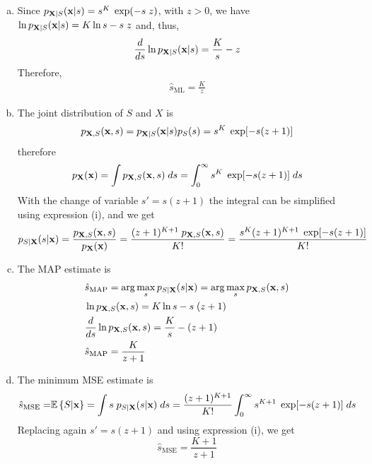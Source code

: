 \begin{solution}[\textcolor{blue}{Solution to problem 2.8}]

\begin{enumerate}[a)]
\item Since $p_{{\bf X}|S}({\bf x}|s) = s^K \; \exp(-s\; z)$, with $z>0$, we have $\ln{p_{{\bf X}|S}({\bf x}|s)} = K \ln{s} - s\; z$ and, thus,
\begin{align*}
\frac{d}{ds} \ln{p_{{\bf X}|S}({\bf x}|s)} = \frac{K}{s} - z
\end{align*}
Therefore,
\begin{align*}
\hat{s}_\text{ML} = \frac{K}{z}
\end{align*}

\item The joint distribution of $S$ and $X$ is
\begin{align*}
p_{{\bf X},S}({\bf x},s) = p_{{\bf X}|S}({\bf x}|s) p_S(s) = s^K \; \exp[-s(z+1)]
\end{align*}
therefore
\begin{align*}
p_{\bf X}({\bf x}) = \int p_{{\bf X},S}({\bf x},s)\; ds = \int_0^\infty s^K \; \exp[-s(z+1)]\;ds 
\end{align*}
With the change of variable $s' = s(z+1)$ the integral can be simplified using expression (i), and we get
\begin{align*}
p_{S|{\bf X}}(s|{\bf x}) 
	= \frac{p_{{\bf X},S}({\bf x},s)}{p_{\bf X}({\bf x})} 
	= \frac{(z+1)^{K+1}\;p_{{\bf X},S}({\bf x},s)}{K !} 
	= \frac{s^K(z+1)^{K+1}\; \exp[-s(z+1)]}{K !}
\end{align*}

\item The MAP estimate is
    \begin{align}
        & {\hat s}_\text{MAP} = \arg\max_s p_{S|{\bf X}}(s|{\bf x}) = \arg\max_s p_{{\bf X},S}({\bf x},s) \nonumber \\
        & \ln{p_{{\bf X},S}({\bf x},s)} = K \ln{s} - s\;(z+1) \nonumber \\
        & \frac{d}{ds} \ln{p_{{\bf X},S}({\bf x},s)} = \frac{K}{s} - (z+1) \nonumber\\
    & {\hat s}_\text{MAP} = \frac{K}{z+1} \nonumber
    \end{align}
    
\item The minimum MSE estimate is
    \begin{align}
        \hat{s}_\text{MSE} = & \mathbb{E}\left\{ S | {\bf x}\right\} = \int s\; p_{S|{\bf X}}(s|{\bf x})\; ds = \displaystyle\frac{(z+1)^{K+1}}{K!} \int_{0}^{\infty} s^{K+1} \; \exp[-s(z+1)]\; ds \nonumber
    \end{align}
    Replacing again $s' = s(z+1)$ and using expression (i), we get $$\hat{s}_\text{MSE} = \frac{K+1}{z+1}$$
    

\end{enumerate}
\end{solution}
